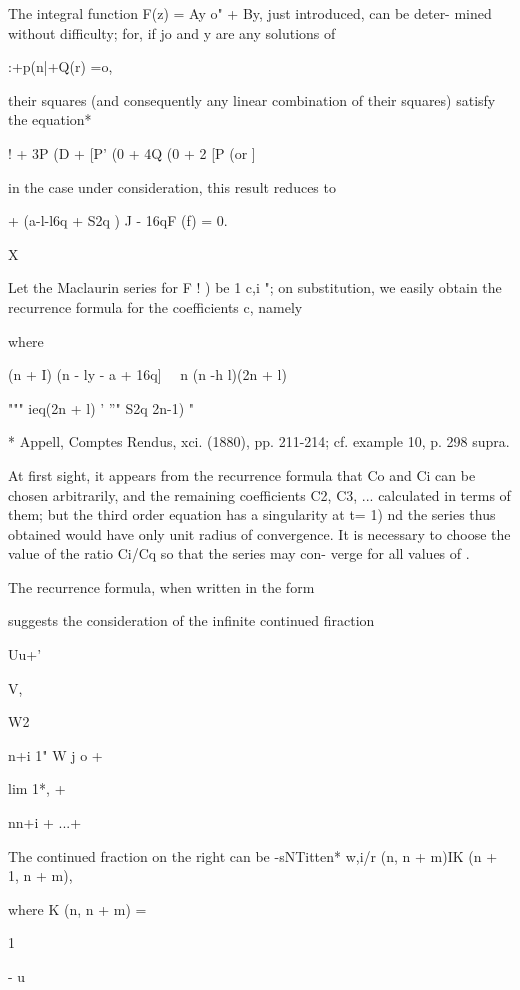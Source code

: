 
The integral function F(z) = Ay o" + By, just introduced, can be
deter- mined without difficulty; for, if jo and y are any solutions
of

 :+p(n|+Q(r) =o,

their squares (and consequently any linear combination of their
squares) satisfy the equation*

 ! + 3P (D + [P' (0 + 4Q (0 + 2 [P (or ]

in the case under consideration, this result reduces to

+ (a-l-l6q + S2q ) J - 16qF (f) = 0.

X

Let the Maclaurin series for F ! ) be 1 c,i "; on substitution, we
easily obtain the recurrence formula for the coefficients c, namely

where

(n + I) (n - ly - a + 16q] \ \ n (n -h l)(2n + l)

""" ieq(2n + l) ' ''" S2q 2n-1) "

* Appell, Comptes Rendus, xci. (1880), pp. 211-214; cf. example 10,
p. 298 supra.

%
%

At first sight, it appears from the recurrence formula that Co and Ci
can be chosen arbitrarily, and the remaining coefficients C2, C3, ...
calculated in terms of them; but the third order equation has a
singularity at t= 1) nd the series thus obtained would have only unit
radius of convergence. It is necessary to choose the value of the
ratio Ci/Cq so that the series may con- verge for all values of .

The recurrence formula, when written in the form

suggests the consideration of the infinite continued firaction

Uu+'

V,

W2

n+i 1" W j o +

lim 1*, +

nn+i + ...+

The continued fraction on the right can be -sNTitten* w,i/r (n, n +
m)IK (n + 1, n + m),

where K (n, n + m) =

1

- u

